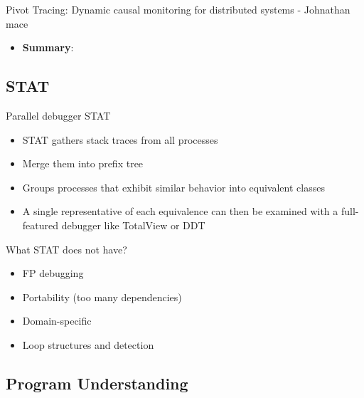 Pivot Tracing: Dynamic causal monitoring for distributed systems - Johnathan mace \cite{pivot} 
\begin{itemize}
\item \textbf{Summary}: 



\end{itemize}

\subsection{STAT}

Parallel debugger STAT\cite{stat}
\begin{itemize}
\item STAT gathers stack traces from all processes
\item Merge them into prefix tree
\item Groups processes that exhibit similar behavior into equivalent classes
\item A single representative of each equivalence can then be examined with a full-featured debugger like TotalView or DDT
\end{itemize}

What STAT does not have?

\begin{itemize}
\item FP debugging
\item Portability (too many dependencies)
\item Domain-specific
\item Loop structures and detection
\end{itemize}
 

\subsection{Program Understanding }


